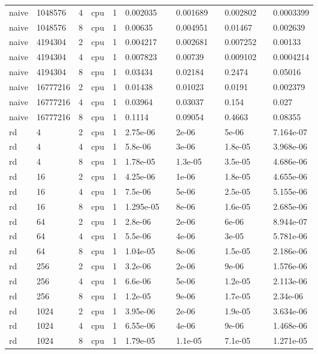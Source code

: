 \begin{tabular}{llllllllllll}
naive & 1048576 & 4 & cpu & 1 & 0.002035 &  & 0.001689 &  & 0.002802 &  & 0.0003399 \\
naive & 1048576 & 8 & cpu & 1 & 0.00635 &  & 0.004951 &  & 0.01467 &  & 0.002639 \\
naive & 4194304 & 2 & cpu & 1 & 0.004217 &  & 0.002681 &  & 0.007252 &  & 0.00133 \\
naive & 4194304 & 4 & cpu & 1 & 0.007823 &  & 0.00739 &  & 0.009102 &  & 0.0004214 \\
naive & 4194304 & 8 & cpu & 1 & 0.03434 &  & 0.02184 &  & 0.2474 &  & 0.05016 \\
naive & 16777216 & 2 & cpu & 1 & 0.01438 &  & 0.01023 &  & 0.0191 &  & 0.002379 \\
naive & 16777216 & 4 & cpu & 1 & 0.03964 &  & 0.03037 &  & 0.154 &  & 0.027 \\
naive & 16777216 & 8 & cpu & 1 & 0.1114 &  & 0.09054 &  & 0.4663 &  & 0.08355 \\
rd & 4 & 2 & cpu & 1 & 2.75e-06 &  & 2e-06 &  & 5e-06 &  & 7.164e-07 \\
rd & 4 & 4 & cpu & 1 & 5.8e-06 &  & 3e-06 &  & 1.8e-05 &  & 3.968e-06 \\
rd & 4 & 8 & cpu & 1 & 1.78e-05 &  & 1.3e-05 &  & 3.5e-05 &  & 4.686e-06 \\
rd & 16 & 2 & cpu & 1 & 4.25e-06 &  & 1e-06 &  & 1.8e-05 &  & 4.655e-06 \\
rd & 16 & 4 & cpu & 1 & 7.5e-06 &  & 5e-06 &  & 2.5e-05 &  & 5.155e-06 \\
rd & 16 & 8 & cpu & 1 & 1.295e-05 &  & 8e-06 &  & 1.6e-05 &  & 2.685e-06 \\
rd & 64 & 2 & cpu & 1 & 2.8e-06 &  & 2e-06 &  & 6e-06 &  & 8.944e-07 \\
rd & 64 & 4 & cpu & 1 & 5.5e-06 &  & 4e-06 &  & 3e-05 &  & 5.781e-06 \\
rd & 64 & 8 & cpu & 1 & 1.04e-05 &  & 8e-06 &  & 1.5e-05 &  & 2.186e-06 \\
rd & 256 & 2 & cpu & 1 & 3.2e-06 &  & 2e-06 &  & 9e-06 &  & 1.576e-06 \\
rd & 256 & 4 & cpu & 1 & 6.6e-06 &  & 5e-06 &  & 1.2e-05 &  & 2.113e-06 \\
rd & 256 & 8 & cpu & 1 & 1.2e-05 &  & 9e-06 &  & 1.7e-05 &  & 2.34e-06 \\
rd & 1024 & 2 & cpu & 1 & 3.95e-06 &  & 2e-06 &  & 1.9e-05 &  & 3.634e-06 \\
rd & 1024 & 4 & cpu & 1 & 6.55e-06 &  & 4e-06 &  & 9e-06 &  & 1.468e-06 \\
rd & 1024 & 8 & cpu & 1 & 1.79e-05 &  & 1.1e-05 &  & 7.1e-05 &  & 1.271e-05 \\

\end{tabular}
